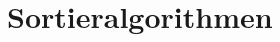 \documentclass{lehramt-informatik-haupt}
\begin{document}

\chapter{Sortieralgorithmen}

\begin{liQuellen}
\cite{wiki:sortierverfahren}
\end{liQuellen}

\literatur
\end{document}
